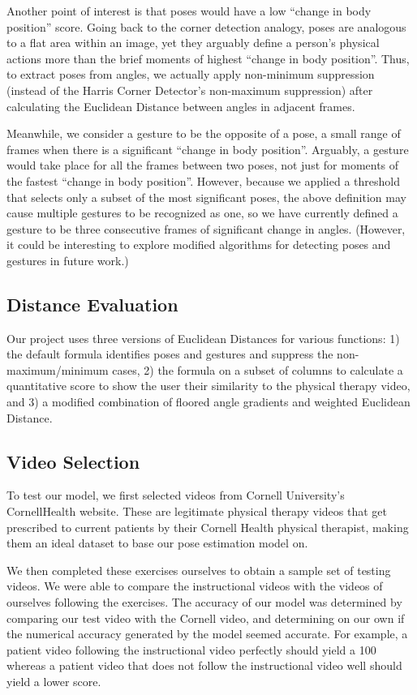 \indent Another point of interest is that poses would have a low “change in body position” score. Going back to the 
corner detection analogy, poses are analogous to a flat area within an  image, yet they arguably define a 
person’s physical actions more than the brief moments of highest “change in body position”. Thus, to extract 
poses from angles, we actually apply non-minimum suppression (instead of the Harris Corner Detector’s 
non-maximum suppression) after calculating the Euclidean Distance between angles in adjacent frames.

\indent Meanwhile, we consider a gesture to be the opposite of a pose, a small range of frames when there is a 
significant “change in body position”. Arguably, a gesture would take place for all the frames between 
two poses, not just for moments of the fastest “change in body position”. However, because we applied a 
threshold that selects only a subset of the most significant poses, the above definition may cause multiple 
gestures to be recognized as one, so we have currently defined a gesture to be three consecutive frames of 
significant change in angles. (However, it could be interesting to explore modified algorithms for detecting 
poses and gestures in future work.)

\subsection{Distance Evaluation}
\indent Our project uses three versions of Euclidean Distances for 
various functions: 1) the default formula identifies poses and gestures 
and suppress the non-maximum/minimum cases, 2) the formula on a subset 
of columns to calculate a quantitative score to show the user their 
similarity to the physical therapy video, and 3) a modified combination 
of floored angle gradients and weighted Euclidean Distance. 

\subsection{Video Selection}
\indent To test our model, we first selected videos from Cornell 
University’s CornellHealth website\cite{Alpher11}. These are legitimate 
physical therapy videos that get prescribed to current patients by their 
Cornell Health physical therapist, making them an ideal dataset to base 
our pose estimation model on.

\indent We then completed these exercises ourselves to obtain a sample 
set of testing videos. We were able to compare the instructional videos 
with the videos of ourselves following the exercises. The accuracy of 
our model was determined by comparing our test video with the Cornell 
video, and determining on our own if the numerical accuracy generated 
by the model seemed accurate. For example, a patient video following 
the instructional video perfectly should yield a 100%
whereas a patient video that does not follow the instructional video 
well should yield a lower score.